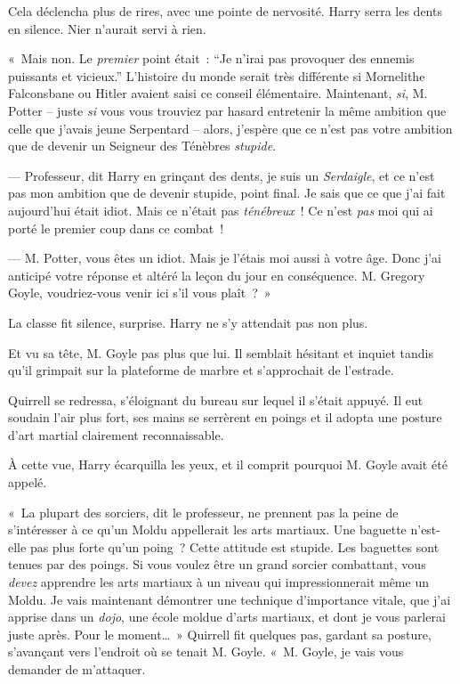 Cela déclencha plus de rires, avec une pointe de nervosité.
Harry serra les dents en silence.
Nier n'aurait servi à rien.

«~Mais non.
Le \emph{premier} point était~: “Je n'irai pas provoquer des ennemis puissants et vicieux.” L'histoire du monde serait très différente si Mornelithe Falconsbane ou Hitler avaient saisi ce conseil élémentaire.
Maintenant, \emph{si}, M. Potter -- juste \emph{si} vous vous trouviez par hasard entretenir la même ambition que celle que j'avais jeune Serpentard -- alors, j'espère que ce n'est pas votre ambition que de devenir un Seigneur des Ténèbres \emph{stupide}.

--- Professeur, dit Harry en grinçant des dents, je suis un \emph{Serdaigle}, et ce n'est pas mon ambition que de devenir stupide, point final.
Je sais que ce que j'ai fait aujourd'hui était idiot.
Mais ce n'était pas \emph{ténébreux}~!
Ce n'est \emph{pas} moi qui ai porté le premier coup dans ce combat~!

--- M. Potter, vous êtes un idiot.
Mais je l'étais moi aussi à votre âge.
Donc j'ai anticipé votre réponse et altéré la leçon du jour en conséquence.
M. Gregory Goyle, voudriez-vous venir ici s'il vous plaît~?~»

La classe fit silence, surprise.
Harry ne s'y attendait pas non plus.

Et vu sa tête, M. Goyle pas plus que lui.
Il semblait hésitant et inquiet tandis qu'il grimpait sur la plateforme de marbre et s'approchait de l'estrade.

Quirrell se redressa, s'éloignant du bureau sur lequel il s'était appuyé.
Il eut soudain l'air plus fort, ses mains se serrèrent en poings et il adopta une posture d'art martial clairement reconnaissable.

À cette vue, Harry écarquilla les yeux, et il comprit pourquoi M. Goyle avait été appelé.

«~La plupart des sorciers, dit le professeur, ne prennent pas la peine de s'intéresser à ce qu'un Moldu appellerait les arts martiaux.
Une baguette n'est-elle pas plus forte qu'un poing~?
Cette attitude est stupide.
Les baguettes sont tenues par des poings.
Si vous voulez être un grand sorcier combattant, vous \emph{devez} apprendre les arts martiaux à un niveau qui impressionnerait même un Moldu.
Je vais maintenant démontrer une technique d'importance vitale, que j'ai apprise dans un \emph{dojo}, une école moldue d'arts martiaux, et dont je vous parlerai juste après.
Pour le moment…~»
Quirrell fit quelques pas, gardant sa posture, s'avançant vers l'endroit où se tenait M. Goyle.
«~M. Goyle, je vais vous demander de m'attaquer.

